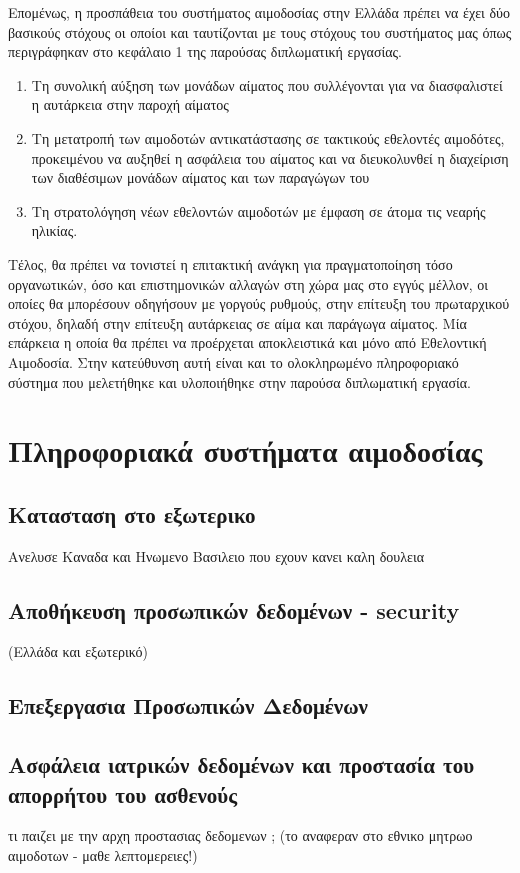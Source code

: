 Επομένως, η προσπάθεια του συστήματος αιμοδοσίας στην Ελλάδα πρέπει να έχει δύο βασικούς στόχους οι οποίοι και ταυτίζονται με τους στόχους του συστήματος μας όπως περιγράφηκαν στο κεφάλαιο 1 της παρούσας διπλωματική εργασίας.
\begin{enumerate}
	\item Τη συνολική αύξηση των μονάδων αίματος που συλλέγονται για να διασφαλιστεί η αυτάρκεια στην παροχή αίματος 
	\item Τη μετατροπή των αιμοδοτών αντικατάστασης σε τακτικούς εθελοντές αιμοδότες, προκειμένου να αυξηθεί η ασφάλεια του αίματος και να διευκολυνθεί η διαχείριση των διαθέσιμων μονάδων αίματος και των παραγώγων του
	\item Τη στρατολόγηση νέων εθελοντών αιμοδοτών με έμφαση σε άτομα τις νεαρής ηλικίας.
\end{enumerate}

Τέλος, θα πρέπει να τονιστεί η επιτακτική ανάγκη για πραγματοποίηση τόσο οργανωτικών, όσο και επιστημονικών αλλαγών στη χώρα μας στο εγγύς μέλλον, οι οποίες θα μπορέσουν οδηγήσουν με γοργούς ρυθμούς, στην επίτευξη του πρωταρχικού στόχου, δηλαδή στην επίτευξη αυτάρκειας σε αίμα και παράγωγα αίματος. Μία επάρκεια η οποία θα πρέπει να προέρχεται αποκλειστικά και μόνο από Εθελοντική Αιμοδοσία. Στην κατεύθυνση αυτή είναι και το ολοκληρωμένο πληροφοριακό σύστημα που μελετήθηκε και υλοποιήθηκε στην παρούσα διπλωματική εργασία.

\section{Πληροφοριακά συστήματα αιμοδοσίας}
	\subsection{Κατασταση στο εξωτερικο}
		Ανελυσε Καναδα και Ηνωμενο Βασιλειο που εχουν κανει καλη δουλεια
	\subsection{Αποθήκευση προσωπικών δεδομένων - security}
		(Ελλάδα και εξωτερικό)
	\subsection{Επεξεργασια Προσωπικών Δεδομένων}
	\subsection{Ασφάλεια ιατρικών δεδομένων και προστασία του απορρήτου του
ασθενούς}
		τι παιζει με την αρχη προστασιας δεδομενων ; (το αναφεραν στο εθνικο μητρωο αιμοδοτων - μαθε λεπτομερειες!)

